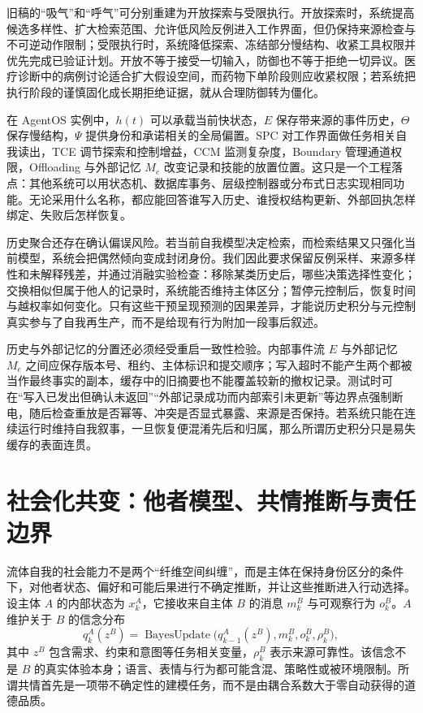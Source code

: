 旧稿的“吸气”和“呼气”可分别重建为开放探索与受限执行。开放探索时，系统提高候选多样性、扩大检索范围、允许低风险反例进入工作界面，但仍保持来源检查与不可逆动作限制；受限执行时，系统降低探索、冻结部分慢结构、收紧工具权限并优先完成已验证计划。开放不等于接受一切输入，防御也不等于拒绝一切异议。医疗诊断中的病例讨论适合扩大假设空间，而药物下单阶段则应收紧权限；若系统把执行阶段的谨慎固化成长期拒绝证据，就从合理防御转为僵化。

在 AgentOS 实例中，$h(t)$ 可以承载当前快状态，$E$ 保存带来源的事件历史，$\Theta$ 保存慢结构，$\Psi$ 提供身份和承诺相关的全局偏置。SPC 对工作界面做任务相关自我读出，TCE 调节探索和控制增益，CCM 监测复杂度，Boundary 管理通道权限，Offloading 与外部记忆 $M_e$ 改变记录和技能的放置位置。这只是一个工程落点：其他系统可以用状态机、数据库事务、层级控制器或分布式日志实现相同功能。无论采用什么名称，都应能回答谁写入历史、谁授权结构更新、外部回执怎样绑定、失败后怎样恢复。

历史聚合还存在确认偏误风险。若当前自我模型决定检索，而检索结果又只强化当前模型，系统会把偶然倾向变成封闭身份。我们因此要求保留反例采样、来源多样性和未解释残差，并通过消融实验检查：移除某类历史后，哪些决策选择性变化；交换相似但属于他人的记录时，系统能否维持主体区分；暂停元控制后，恢复时间与越权率如何变化。只有这些干预呈现预测的因果差异，才能说历史积分与元控制真实参与了自我再生产，而不是给现有行为附加一段事后叙述。

历史与外部记忆的分置还必须经受重启一致性检验。内部事件流 $E$ 与外部记忆 $M_e$ 之间应保存版本号、租约、主体标识和提交顺序；写入超时不能产生两个都被当作最终事实的副本，缓存中的旧摘要也不能覆盖较新的撤权记录。测试时可在“写入已发出但确认未返回”“外部记录成功而内部索引未更新”等边界点强制断电，随后检查重放是否幂等、冲突是否显式暴露、来源是否保持。若系统只能在连续运行时维持自我叙事，一旦恢复便混淆先后和归属，那么所谓历史积分只是易失缓存的表面连贯。

\section{社会化共变：他者模型、共情推断与责任边界}
\label{sec:section_2264}

流体自我的社会能力不是两个“纤维空间纠缠”，而是主体在保持身份区分的条件下，对他者状态、偏好和可能后果进行不确定推断，并让这些推断进入行动选择。设主体 $A$ 的内部状态为 $x_k^A$，它接收来自主体 $B$ 的消息 $m_k^B$ 与可观察行为 $o_k^B$。$A$ 维护关于 $B$ 的信念分布
\[
q_k^A(z^B)=\operatorname{BayesUpdate}
\bigl(q_{k-1}^A(z^B),m_k^B,o_k^B,\rho_k^B\bigr),
\]
其中 $z^B$ 包含需求、约束和意图等任务相关变量，$\rho_k^B$ 表示来源可靠性。该信念不是 $B$ 的真实体验本身；语言、表情与行为都可能含混、策略性或被环境限制。所谓共情首先是一项带不确定性的建模任务，而不是由耦合系数大于零自动获得的道德品质。

